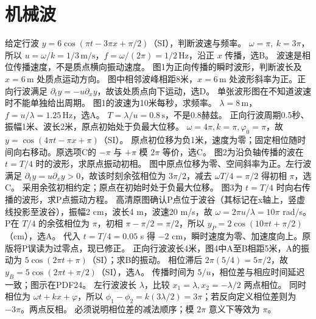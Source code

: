 \section{机械波}
\problemtext 给定行波 $y=6\cos(\pi t-3\pi x+\pi/2)$（SI），判断波速与频率。
\workings $\omega=\pi,\ k=3\pi$，所以 $u=\omega/k=1/3\,\mathrm{m/s}$，$f=\omega/(2\pi)=1/2\,\mathrm{Hz}$，沿正 $x$ 传播，选B。
\crosscheck 波速是相位传播速度，不是质点横向振动速度。
\problemtext 图1为正向传播的瞬时波形，判断波长及 $x=6\,\mathrm m$ 处质点运动方向。
\workings 图中相邻波峰相距8米，$x=6\,\mathrm m$ 处波形斜率为正。正向行波满足 $\partial_t y=-u\partial_x y$，故该处质点向下运动，选D。
\crosscheck 单张波形图在不知道波速时不能单独给出周期。
\problemtext 图1的波速为10米每秒，求频率。
\workings $\lambda=8\,\mathrm m$，$f=u/\lambda=1.25\,\mathrm{Hz}$，选A。
\crosscheck $T=\lambda/u=0.8\,\mathrm s$，不是0.8赫兹。
\problemtext 正向行波周期0.5秒、振幅1米、波长2米，原点初始处于负最大位移。
\workings $\omega=4\pi,k=\pi,\varphi_0=\pi$，故 $y=\cos(4\pi t-\pi x+\pi)$（SI）。
\crosscheck 原点初位移为负1米，速度为零；固定相位随时间向右移动。原选项C的 $-\pi$ 与 $+\pi$ 模 $2\pi$ 等价，选C。
\problemtext 图2为沿负轴传播的波在 $t=T/4$ 时的波形，求原点振动初相。
\workings 图中原点位移为零、空间斜率为正。左行波满足 $\partial_t y=u\partial_x y>0$，故该时刻余弦相位为 $3\pi/2$，减去 $\omega T/4=\pi/2$ 得初相 $\pi$，选C。
\crosscheck 采用余弦初相约定；原点在初始时处于负最大位移。
\problemtext 图3为 $t=T/4$ 时向右传播的波形，求P点振动方程。
\workings 高清原图确认P点位于波谷（其标记在x轴上，竖虚线投影至波谷），振幅2 cm，波长4 m，波速20 m/s，故 $\omega=2\pi u/\lambda=10\pi$ rad/s。P在 $T/4$ 的余弦相位为 $\pi$，初相 $\pi-\pi/2=\pi/2$，所以 $y_P=2\cos(10\pi t+\pi/2)$（cm），选A。
\crosscheck 代入 $t=T/4=0.05$ s 得 $-2$ cm，瞬时速度为零、加速度向上。原版将P误读为过零点，现已修正。
\problemtext 正向行波波长4米，图4中A至B相距5米，A的振动为 $5\cos(2\pi t+\pi)$（SI）；求B的振动。
\workings 相位滞后 $2\pi(5/4)=5\pi/2$，故 $y_B=5\cos(2\pi t+\pi/2)$（SI），选A。
\crosscheck 传播时间为 $5/u$，相位差与相应时间延迟一致；图示在PDF24。
\problemtext 左行波波长 $\lambda$，比较 $x_1=\lambda,x_2=-\lambda/2$ 两点相位。
\workings 同时相位为 $\omega t+kx+\varphi$，所以 $\phi_1-\phi_2=k(3\lambda/2)=3\pi$；若反向定义相位差则为 $-3\pi$。两点反相。
\crosscheck 必须说明相位差的减法顺序；模 $2\pi$ 意义下等效为 $\pi$。
